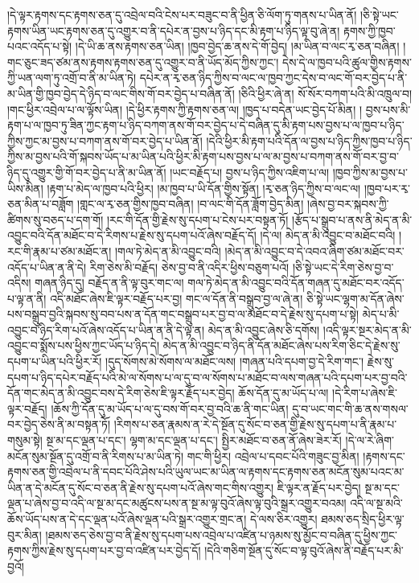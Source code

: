 །དེ་ལྟར་རྟགས་དང་རྟགས་ཅན་དུ་འབྲེལ་བའི་ངེས་པར་བཟུང་བ་ནི་ཕྱིན་ཅི་ལོག་ཏུ་གནས་པ་ཡིན་ནོ། །ཅི་སྟེ་ཡང་རྟགས་ཡིན་ཡང་རྟགས་ཅན་དུ་འགྱུར་བ་ནི་དཔེར་ན་བྱས་པ་ཉིད་དང་མི་རྟག་པ་ཉིད་ལྟ་བུ་ཞེ་ན། རྟགས་ཀྱི་ཁྱབ་པའང་འདོད་པ་སྟེ། །དེ་ཡི་ཆ་ནས་རྟགས་ཅན་ཡིན། །ཁྱབ་བྱེད་ཆ་ནས་དེ་གོ་བྱེད། །མ་ཡིན་བ་ལང་རྭ་ཅན་བཞིན། །གང་ཅུང་ཟད་ཙམ་ནས་རྟགས་རྟགས་ཅན་དུ་འགྱུར་བ་ནི་ཡོད་མོད་ཀྱིས་ཀྱང་། དེས་དེ་ལ་ཁྱབ་པའི་ཚུལ་གྱིས་རྟགས་ཀྱི་ཡན་ལག་ཏུ་འགྲོ་བ་ནི་མ་ཡིན་ཏེ། དཔེར་ན་རྭ་ཅན་ཉིད་ཀྱིས་བ་ལང་ལ་ཁྱབ་ཀྱང་དེས་བ་ལང་གོ་བར་བྱེད་པ་ནི་མ་ཡིན་གྱི་ཁྱབ་བྱེད་དེ་ཉིད་བ་ལང་གིས་གོ་བར་བྱེད་པ་བཞིན་ནོ། །ཅིའི་ཕྱིར་ཞེ་ན། སོ་སོར་བཀག་པའི་མི་འཁྲུལ་བ། །གང་ཕྱིར་འབྲེལ་པ་ལ་ལྟོས་ཡིན། །དེ་ཕྱིར་རྟགས་ཀྱི་རྟགས་ཅན་ལ། །ཁྱད་པ་བདེན་ཡང་བྱེད་པོ་མིན། །
བྱས་པས་མི་རྟག་པ་ལ་ཁྱབ་ཏུ་ཟིན་ཀྱང་རྟག་པ་ཉིད་བཀག་ནས་གོ་བར་བྱེད་པ་དེ་བཞིན་དུ་མི་རྟག་པས་བྱས་པ་ལ་ཁྱབ་པ་ཉིད་ཀྱིས་ཀྱང་མ་བྱས་པ་བཀག་ནས་གོ་བར་བྱེད་པ་ཡིན་ནོ། །དེའི་ཕྱིར་མི་རྟག་པའི་དོན་ལ་བྱས་པ་ཉིད་ཀྱིས་ཁྱབ་པ་ཉིད་ཀྱིས་མ་བྱས་པའི་གོ་སྐབས་ཡོད་པ་མ་ཡིན་པའི་ཕྱིར་མི་རྟག་པས་བྱས་པ་ལ་མ་བྱས་པ་བཀག་ནས་གོ་བར་བྱ་བ་ཉིད་དུ་འགྱུར་གྱི་གོ་བར་བྱེད་པ་ནི་མ་ཡིན་ནོ། །ཡང་བརྗོད་པ། བྱས་པ་ཉིད་ཀྱིས་འཇིག་པ་ལ། །ཁྱབ་ཀྱིས་མ་བྱས་པ་ཡིས་མིན། །རྟག་པ་མེད་ལ་ཁྱབ་པའི་ཕྱིར། །མ་ཁྱབ་པ་ཡི་དོན་གྱིས་སྟོན། །རྭ་ཅན་ཉིད་ཀྱིས་བ་ལང་ལ། །ཁྱབ་པར་རྭ་ཅན་མིན་པ་བཟློག །གླང་ལ་རྭ་ཅན་གྱིས་ཁྱབ་བཞིན། །བ་ལང་གི་དོན་ཟློག་བྱེད་མིན། །ཞེས་བྱ་བར་སྐབས་ཀྱི་ཚིགས་སུ་བཅད་པ་དག་གོ། །རང་གི་དོན་གྱི་རྗེས་སུ་དཔག་པ་ངེས་པར་བསྟན་ཏོ། །རྩོད་པ་སྒྲུབ་པ་ནས་ནི་མེད་ན་མི་འབྱུང་བའི་དོན་མཐོང་བ་དེ་རིགས་པ་རྗེས་སུ་དཔག་པའོ་ཞེས་བརྗོད་དོ། །དེ་ལ། མེད་ན་མི་འབྱུང་བ་མཐོང་བའི། །རང་གི་རྣམ་པ་ཙམ་མཐོང་ན། །གལ་ཏེ་མེད་ན་མི་འབྱུང་བའི། །མེད་ན་མི་འབྱུང་བ་དེ་འབའ་ཞིག་ཙམ་མཐོང་བར་འདོད་པ་ཡིན་ན་ནི་དེ། རིག་ཅེས་མི་བརྗོད། ཅེས་བྱ་བ་ནི་འདིར་ཕྱིས་བཅུག་པའོ། །ཅི་སྟེ་ཡང་དེ་རིག་ཅེས་བྱ་བ་འདིས། གཞན་ཉིད་དུ། བརྗོད་ན་ནི་ལྟ་བུར་གང་ལ། གལ་ཏེ་མེད་ན་མི་འབྱུང་བའི་དོན་གཞན་དུ་མཐོང་བར་འདོད་པ་ལྟ་ན་ནི། འདི་མཐོང་ཞེས་ཇི་ལྟར་བརྗོད་པར་བྱ། གང་ལ་དོན་ནི་བསྒྲུབ་བྱ་ལ་ཞེ་ན། ཅི་སྟེ་ཡང་ལྷག་མ་དོན་ཞེས་པས་བསྒྲུབ་བྱའི་སྐབས་སུ་བབ་པས་ན་དོན་གང་བསྒྲུབ་པར་བྱ་བ་ལ་མཐོང་བ་དེ་རྗེས་སུ་དཔག་པ་སྟེ། མེད་པ་མི་འབྱུང་བ་ཉིད་རིག་པའོ་ཞེས་འདོད་པ་ཡིན་ན་ནི་དེ་ལྟ་ན། མེད་ན་མི་འབྱུང་ཞེས་ཅི་དགོས། །འདི་ལྟར་སྔར་མེད་ན་མི་འབྱུང་བ་སྨོས་པས་ཕྱིས་ཀྱང་ཡོད་པ་ཉིད་དེ། མེད་ན་མི་འབྱུང་བ་ཉིད་ནི་དོན་མཐོང་ཞེས་པས་རིག་ཅིང་དེ་རྗེས་སུ་དཔག་པ་ཡིན་པའི་ཕྱིར་རོ། །དུད་སོགས་མེ་སོགས་ལ་མཐོང་ལས། །གཞན་པའི་དཔག་བྱ་དེ་རིག་གང་། རྗེས་སུ་དཔག་པ་ཉིད་དཔེར་བརྗོད་པའི་མེ་ལ་སོགས་པ་ལ་དུ་བ་ལ་སོགས་པ་མཐོང་བ་ལས་གཞན་པའི་དཔག་པར་བྱ་བའི་དོན་གང་མེད་ན་མི་འབྱུང་བས་དེ་རིག་ཅེས་ཇི་ལྟར་རྗོད་པར་བྱེད། ཆོས་དོན་དུ་མ་ཡོད་པ་ལ། །དེ་རིག་པ་ཞེས་ཇི་ལྟར་བརྗོད། །ཆོས་ཀྱི་དོན་དུ་མ་ཡོད་པ་ལ་དུ་བས་གོ་བར་བྱ་བའི་ཆ་ནི་གང་ཡིན། དུ་བ་ཡང་གང་གི་ཆ་ནས་གསལ་བར་བྱེད་ཅེས་ནི་མ་བསྟན་ཏོ། །རིགས་པ་ཅན་རྣམས་ན་རེ་དེ་སྔོན་དུ་སོང་བ་ཅན་གྱི་རྗེས་སུ་དཔག་པ་ནི་རྣམ་པ་གསུམ་སྟེ། སྔ་མ་དང་ལྡན་པ་དང་། ལྷག་མ་དང་ལྡན་པ་དང་། སྤྱིར་མཐོང་བ་ཅན་ནོ་ཞེས་ཟེར་རོ། །དེ་ལ་རེ་ཞིག་མངོན་སུམ་སྔོན་དུ་འགྲོ་བ་ནི་རིགས་པ་མ་ཡིན་ཏེ། གང་གི་ཕྱིར། འབྲེལ་པ་དབང་པོའི་གཟུང་བྱ་མིན། །རྟགས་དང་རྟགས་ཅན་གྱི་འབྲེལ་པ་ནི་དབང་པོའི་ཤེས་པའི་ཡུལ་ཡང་མ་ཡིན་ལ་རྟགས་དང་རྟགས་ཅན་མངོན་སུམ་པའང་མ་ཡིན་ན་དེ་མངོན་དུ་སོང་བ་ཅན་ནི་རྗེས་སུ་དཔག་པའོ་ཞེས་གང་གིས་འགྱུར། ཇི་ལྟར་ན་རྗོད་པར་བྱེད། སྔ་མ་དང་ལྡན་པ་ཞེས་བྱ་བ་འདི་ལ་སྔ་མ་དང་མཚུངས་པས་ན་སྔ་མ་ལྟ་བུའོ་ཞེས་ལྟ་བུའི་སྒྲར་འགྱུར་བའམ། འདི་ལ་སྔ་མའི་ཆོས་ཡོད་པས་ན་དེ་དང་ལྡན་པའོ་ཞེས་ལྡན་པའི་སྒྲར་འགྱུར་གྲང་ན། དེ་ལས་ཅིར་འགྱུར། ཐམས་ཅད་སྲིད་ཕྱིར་ལྟ་བུར་མིན། །ཐམས་ཅད་ཅེས་བྱ་བ་ནི་རྗེས་སུ་དཔག་པས་འབྲེལ་པ་འཛིན་པ་ཉམས་སུ་མྱོང་བ་བཞིན་དུ་ཕྱིས་ཀྱང་རྟགས་ཀྱིས་རྗེས་སུ་དཔག་པར་བྱ་བ་འཛིན་པར་བྱེད་དོ། །དེའི་གཅིག་སྔོན་དུ་སོང་བ་ལྟ་བུའོ་ཞེས་ནི་བརྗོད་པར་མི་བྱའོ། 